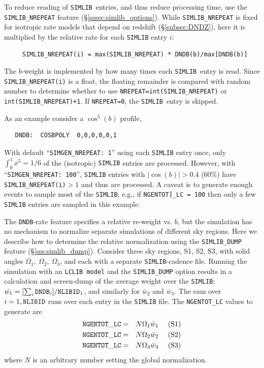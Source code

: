 \documentclass[12pt]{article}
\newcommand{\simlib}{{\tt SIMLIB}}
\begin{document}
To reduce reading of \simlib\ entries,
and thus reduce processing time, 
use the {\tt SIMLIB\_NREPEAT} feature (\S\ref{sssec:simlib_options}).
While {\tt SIMLIB\_NREPEAT} is fixed for isotropic rate models
that depend on redshift (\S\ref{subsec:DNDZ}), 
here it is multiplied by the relative rate for each {\tt SIMLIB} entry $i$:
\begin{verbatim}
     SIMLIB_NREPEAT(i) = max(SIMLIB_NREPEAT) * DNDB(b)/max[DNDB(b)]
\end{verbatim}
The $b$-weight is implemented by how many times each
\simlib\ entry is read. Since {\tt SIMLIB\_NREPEAT(i)} is a float, 
the floating remainder is compared with random number
to determine whether to use 
{\tt NREPEAT=int(SIMLIB\_NREPEAT)} or {\tt int(SIMLIB\_NREPEAT)+1}.
If {\tt NREPEAT=0}, the \simlib\ entry is skipped.

\medskip
As an  example consider a $\cos^5(b)$ profile,
\vspace{-0.2cm}
\begin{verbatim}
   DNDB:  COSBPOLY  0,0,0,0,0,1
\end{verbatim}
With default ``{\tt SIMGEN\_NREPEAT: 1}'' using each
{\tt SIMLIB} entry once,
only $\int_0^1 x^5 = 1/6$ of the (isotropic) {\tt SIMLIB} entries
are processed.
However, with ``{\tt SIMGEN\_NREPEAT: 100}'', 
{\tt SIMLIB} entries with $|\cos(b)| > 0.4$ (60\%) have 
{\tt SIMLIB\_NREPEAT(i)}$>1$ and thus are processed.
A caveat is to generate enough events to sample most of
the {\tt SIMLIB}; e.g., if {\tt NGENTOT]\_LC = 100} then
only a few {\tt SIMLIB} entries are sampled in this example.


\clearpage
The {\tt DNDB}-rate feature specifies a relative re-weight vs. $b$,
but the simulation has no mechanism to normalize separate simulations
of different sky regions. Here we describe how to determine
the relative normalization using the 
{\tt SIMLIB\_DUMP} feature (\S\ref{sss:simlib_dump}).
Consider three sky regions, S1, S2, S3, with solid angles
$\Omega_1,~\Omega_2,~\Omega_3$, and each with a separate 
{\tt SIMLIB}-cadence file.
Running the simulation with an {\tt LCLIB model} and the
{\tt SIMLIB\_DUMP} option results in a calculation and screen-dump
of the average weight over the {\tt SIMLIB}: 
$\bar{w_1} = [\sum_i{\tt DNDB}_i]/{\tt NLIBID}_1$,
and similarly for $\bar{w}_2$ and $\bar{w}_3$. 
The sum over $i=1, {\tt NLIBID}$ runs over each entry in the 
{\tt SIMLIB} file. The {\tt NGENTOT\_LC} values to generate are
%
\begin{eqnarray}
 {\tt NGENTOT\_LC} & = & N \Omega_1 \bar{w}_1~~~~({\rm S1}) 
    \nonumber \\
 {\tt NGENTOT\_LC} & = & N \Omega_2 \bar{w}_2~~~~({\rm S2}) 
    \nonumber \\
 {\tt NGENTOT\_LC} & = & N \Omega_3 \bar{w}_3~~~~({\rm S3}) 
    \nonumber
\end{eqnarray}
%
where $N$ is an arbitrary number setting the global normalization.
\end{document}
